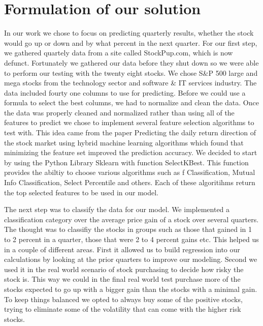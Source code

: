 \documentclass[conference]{IEEEtran}
\begin{document}
\section{Formulation of our solution}
In our work we chose to focus on predicting quarterly results, whether the stock would go up or down and by what percent in the next quarter.  For our first step, we gathered quartely data from a site called StockPup.com, which is now defunct. Fortunately we gathered our data before they shut down so we were able to perform our testing with the twenty eight stocks. We chose S\&P 500 large and mega stocks from the technology sector and software \& IT services industry.  The data included fourty one columns to use for predicting.  Before we could use a formula to select the best columns, we had to normalize and clean the data. 
Once the data was properly cleaned and normalized rather than using all of the features to predict we chose to implement several feature selection algorithms to test with.  This idea came from the paper Predicting the daily return direction of the stock market using hybrid machine learning algorithms \cite{DailyReturnDirection} which found that minimizing the feature set improved the prediction accuracy.  We decided to start by using the Python Library Sklearn with function SelectKBest.  This function provides the abiltiy to choose various algorithms such as f Classification, Mutual Info Classification, Select Percentile and others.  Each of these algoritihms return the top selected features to be used in our model. 

The next step was to classify the data for our model. We implemented a classification category over the average price gain of a stock over several quarters.  The thought was to classifiy the stocks in groups such as those that gained in 1 to 2 percent in a quarter, those that were 2 to 4 percent gains etc. This helped us in a couple of different areas.  First it allowed us to build regression into our calculations by looking at the prior quarters to improve our modeling.  Second we used it in the real world scenario of stock purchasing to decide how risky the stock is. This way we could in the final real world test purchase more of the stocks expected to go up with a bigger gain than the stocks with a minimal gain.  To keep things balanced we opted to always buy some of the positive stocks, trying to eliminate some of the volatility that can come with the higher risk stocks.
\end{document}
